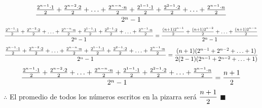 \documentclass{book}
\begin{document}
\begin{enumerate}
        $$\frac{{2^{n-1}\cdot 1\over 2}+{2^{n-2}\cdot 2\over 2}+\ldots+{2^{n-n}\cdot n\over 2}+{2^{1-1}\cdot 1\over 2}+{2^{2-1}\cdot 2\over 2}+\ldots+{2^{n-1}\cdot n\over 2}}{2^n-1}$$
        $$\frac{{2^{n-1}\cdot 1\over 2}+{2^{n-2}\cdot 2\over 2}+\ldots+{2^{n-n}\cdot n\over 2}+{2^{1-1}\cdot 1\over 2}+{2^{2-1}\cdot 2\over 2}+\ldots+{2^{n-1}\cdot n\over 2}}{2^n-1}=\frac{{(n+1)2^{n-1}\over 2}+{(n+1)2^{n-2}\over 2}+\ldots+{(n+1)2^{n-n}\over 2}}{2^n-1}$$
        $$\frac{{2^{n-1}\cdot 1\over 2}+{2^{n-2}\cdot 2\over 2}+\ldots+{2^{n-n}\cdot n\over 2}+{2^{1-1}\cdot 1\over 2}+{2^{2-1}\cdot 2\over 2}+\ldots+{2^{n-1}\cdot n\over 2}}{2^n-1}=\frac{(n+1)(2^{n-1}+2^{n-2}+\ldots+1)}{2(2-1)(2^{n-1}+2^{n-2}+\ldots+1)}$$
        $$\frac{{2^{n-1}\cdot 1\over 2}+{2^{n-2}\cdot 2\over 2}+\ldots+{2^{n-n}\cdot n\over 2}+{2^{1-1}\cdot 1\over 2}+{2^{2-1}\cdot 2\over 2}+\ldots+{2^{n-1}\cdot n\over 2}}{2^n-1}={n+1 \over 2}$$
        $\therefore$ El promedio de todos los números escritos en la pizarra será $\displaystyle{{n+1 \over 2}}$ $\blacksquare$\\
    \end{enumerate}
\end{document}
